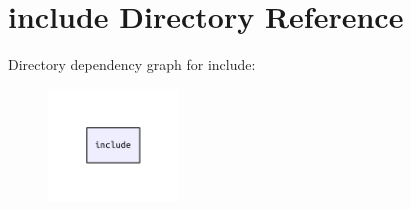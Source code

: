 \section{include Directory Reference}
\label{dir_d44c64559bbebec7f509842c48db8b23}
Directory dependency graph for include\+:\nopagebreak
\begin{figure}[H]
\begin{center}
\leavevmode
\includegraphics[width=98pt]{dir_d44c64559bbebec7f509842c48db8b23_dep}
\end{center}
\end{figure}
